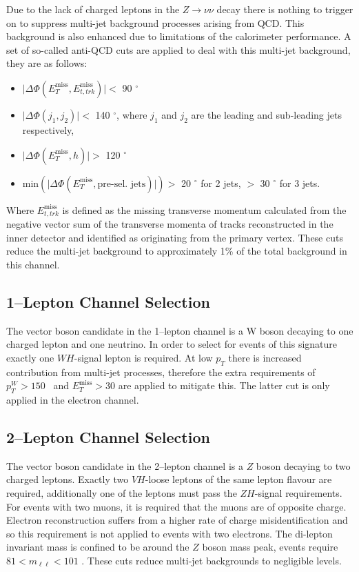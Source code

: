 Due to the lack of charged leptons in the $Z \rightarrow \nu\nu$ decay there is
nothing to trigger on to suppress multi-jet background processes arising from
QCD. This background is also enhanced due to limitations of the calorimeter
performance. A set of so-called anti-QCD cuts are applied to deal with this
multi-jet background, they are as follows:
\begin{itemize}
\item $\lvert \Delta \Phi ( E_T^{\text{miss}} ,
  E_{t, trk}^{\text{miss}} ) \rvert <$ 90 $^\circ$
\item $\lvert \Delta \Phi ( j_1 , j_2 ) \rvert <$ 140 $^\circ$, where $j_1$ and
  $j_2$ are the leading and sub-leading jets respectively,
\item $\lvert \Delta \Phi ( E_T^{\text{miss}} , h ) \rvert >$ 120 $^\circ$
\item $\text{min} ( \lvert \Delta \Phi ( E_T^{\text{miss}} ,
  \text{pre-sel. jets}) \rvert ) >$ 20 $^\circ$ for  2 jets,
  $>$ 30 $^\circ$ for 3 jets.
\end{itemize}
Where $E_{t, trk}^{\text{miss}}$ is defined as the missing transverse momentum
calculated from the negative vector sum of the transverse momenta of tracks
reconstructed in the inner detector and identified as originating from the
primary vertex. These cuts reduce the multi-jet background to approximately 1\%
of the total background in this channel.

\subsection{1--Lepton Channel Selection}
\label{sec:1lep-selection}

The vector boson candidate in the 1--lepton channel is a W boson decaying to one
charged lepton and one neutrino. In order to select for events of this signature
exactly one $WH$-signal lepton is required. At low $p_T$ there is increased
contribution from multi-jet processes, therefore the extra requirements of
$p_T^{W} > 150$ \GeV\ and $E_T^{\text{miss}} > 30$ \GeV are applied to mitigate
this. The latter cut is only applied in the electron channel.  

\subsection{2--Lepton Channel Selection}
\label{sec:2lep-selection}

The vector boson candidate in the 2--lepton channel is a $Z$ boson decaying to
two charged leptons. Exactly two $VH$-loose leptons of the same lepton flavour
are required, additionally one of the leptons must pass the $ZH$-signal
requirements. For events with two muons, it is required that the muons are of
opposite charge. Electron reconstruction suffers from a higher rate of charge
misidentification and so this requirement is not applied to events with two
electrons. The di-lepton invariant mass is confined to be around the $Z$ boson
mass peak, events require $81 < m_{\ell\ell} < 101$ \GeV. These cuts reduce
multi-jet backgrounds to negligible levels.

